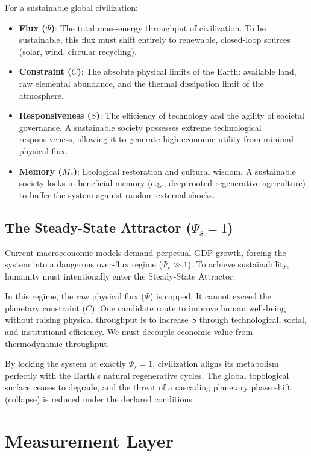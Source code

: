 \documentclass[11pt,a4paper]{article}
\begin{document}
For a sustainable global civilization:
\begin{itemize}
    \item \textbf{Flux ($\Phi$)}: The total mass-energy throughput of civilization. To be sustainable, this flux must shift entirely to renewable, closed-loop sources (solar, wind, circular recycling).
    \item \textbf{Constraint ($C$)}: The absolute physical limits of the Earth: available land, raw elemental abundance, and the thermal dissipation limit of the atmosphere.
    \item \textbf{Responsiveness ($S$)}: The efficiency of technology and the agility of societal governance. A sustainable society possesses extreme technological responsiveness, allowing it to generate high economic utility from minimal physical flux.
    \item \textbf{Memory ($M_s$)}: Ecological restoration and cultural wisdom. A sustainable society locks in beneficial memory (e.g., deep-rooted regenerative agriculture) to buffer the system against random external shocks.
\end{itemize}

\subsection{The Steady-State Attractor ($\Psi_s = 1$)}
Current macroeconomic models demand perpetual GDP growth, forcing the system into a dangerous over-flux regime ($\Psi_s \gg 1$). To achieve sustainability, humanity must intentionally enter the Steady-State Attractor.

In this regime, the raw physical flux ($\Phi$) is capped. It cannot exceed the planetary constraint ($C$). One candidate route to improve human well-being without raising physical throughput is to increase $S$ through technological, social, and institutional efficiency. We must decouple economic value from thermodynamic throughput.

By locking the system at exactly $\Psi_s = 1$, civilization aligns its metabolism perfectly with the Earth's natural regenerative cycles. The global topological surface ceases to degrade, and the threat of a cascading planetary phase shift (collapse) is reduced under the declared conditions.



\section{Measurement Layer}
\end{document}

